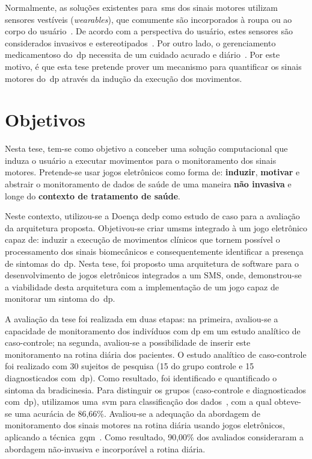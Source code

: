 Normalmente, as soluções existentes para~\ac{sms} dos sinais motores utilizam sensores vestíveis (\textit{wearables}), que comumente são incorporados à roupa ou ao corpo do usuário~\cite{classifiersparkinson2014}. De acordo com a perspectiva do usuário, estes sensores são considerados invasivos e estereotipados~\cite{aarhus_negotiating_2010}. Por outro lado, o gerenciamento medicamentoso do~\ac{dp} necessita de um cuidado acurado e diário~\cite{quantitativeparkinson2011}. Por este motivo, é que esta tese pretende prover um mecanismo para quantificar os sinais motores do~\ac{dp} através da indução da execução dos movimentos.


\section{Objetivos}\label{section:objetivos}
Nesta tese, tem-se como objetivo a conceber uma solução computacional que induza o usuário a executar movimentos para o monitoramento dos sinais motores. Pretende-se usar jogos eletrônicos como forma de: \textbf{induzir}, \textbf{motivar} e abstrair o monitoramento de dados de saúde de uma maneira \textbf{não invasiva} e longe do \textbf{contexto de tratamento de saúde}.

Neste contexto, utilizou-se a Doença de\ac{dp} como estudo de caso para a avaliação da arquitetura proposta. Objetivou-se criar um\ac{sms} integrado à um jogo eletrônico capaz de: induzir a execução de movimentos clínicos que tornem possível o processamento dos sinais biomecânicos e consequentemente identificar a presença de sintomas do~\ac{dp}. Nesta tese, foi proposto uma arquitetura de software para o desenvolvimento de jogos eletrônicos integrados a um SMS, onde, demonstrou-se a viabilidade desta arquitetura com a implementação de um jogo capaz de monitorar um sintoma do~\ac{dp}.

A avaliação da tese foi realizada em duas etapas: na primeira, avaliou-se a capacidade de monitoramento dos indivíduos com \ac{dp} em um estudo analítico de caso-controle; na segunda, avaliou-se a possibilidade de inserir este monitoramento na rotina diária dos pacientes. O estudo analítico de caso-controle foi realizado com 30 sujeitos de pesquisa (15 do grupo controle e 15 diagnosticados com~\ac{dp}). Como resultado, foi identificado e quantificado o sintoma da bradicinesia. Para distinguir os grupos (caso-controle e diagnosticados com~\ac{dp}), utilizamos uma~\ac{svm} para classificação dos dados~\cite{datamining2005}, com a qual obteve-se uma acurácia de 86,66\%. Avaliou-se a adequação da abordagem de monitoramento dos sinais motores na rotina diária usando jogos eletrônicos, aplicando a técnica~\ac{gqm}~\cite{van1999goal}. Como resultado, 90,00\% dos avaliados consideraram a abordagem não-invasiva e incorporável a rotina diária. 

